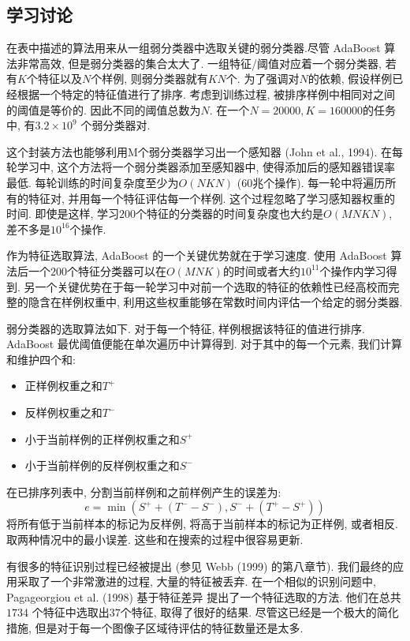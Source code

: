 \documentclass[a4paper,utf8,11pt, onecolumn]{ctexart}
\begin{document}
\subsection{学习讨论}
在表中描述的算法用来从一组弱分类器中选取关键的弱分类器.尽管 AdaBoost 算法非常高效, 但是弱分类器的集合太大了. 一组特征/阈值对应着一个弱分类器, 若有$K$个特征以及$N$个样例, 则弱分类器就有$KN$个. 为了强调对$N$的依赖, 假设样例已经根据一个特定的特征值进行了排序. 考虑到训练过程, 被排序样例中相同对之间的阈值是等价的. 因此不同的阈值总数为$N$. 在一个$N=20000, K=160000$的任务中, 有$3.2\times 10^9$ 个弱分类器对.

这个封装方法也能够利用M个弱分类器学习出一个感知器 (John et al., 1994). 在每轮学习中, 这个方法将一个弱分类器添加至感知器中, 使得添加后的感知器错误率最低. 每轮训练的时间复杂度至少为$O(NKN)$ ($60$兆个操作). 每一轮中将遍历所有的特征对, 并用每一个特征评估每一个样例.
这个过程忽略了学习感知器权重的时间. 即使是这样, 学习$200$个特征的分类器的时间复杂度也大约是$O(MNKN)$, 差不多是$10^{16}$个操作.

作为特征选取算法, AdaBoost 的一个关键优势就在于学习速度. 使用 AdaBoost 算法后一个$200$个特征分类器可以在$O(MNK)$的时间或者大约$10^{11}$个操作内学习得到. 另一个关键优势在于每一轮学习中对前一个选取的特征的依赖性已经高校而完整的隐含在样例权重中, 利用这些权重能够在常数时间内评估一个给定的弱分类器.

弱分类器的选取算法如下. 对于每一个特征, 样例根据该特征的值进行排序. AdaBoost 最优阈值便能在单次遍历中计算得到. 对于其中的每一个元素, 我们计算和维护四个和:
\begin{itemize}
\item 正样例权重之和$T^+$
\item 反样例权重之和$T^-$
\item 小于当前样例的正样例权重之和$S^+$
\item 小于当前样例的反样例权重之和$S^-$
\end{itemize}
在已排序列表中, 分割当前样例和之前样例产生的误差为:
\[
e=\min(S^++(T^--S^-),S^-+(T^+-S^+))
\]
将所有低于当前样本的标记为反样例, 将高于当前样本的标记为正样例, 或者相反. 取两种情况中的最小误差. 这些和在搜索的过程中很容易更新.

有很多的特征识别过程已经被提出 (参见 Webb (1999) 的第八章节). 我们最终的应用采取了一个非常激进的过程, 大量的特征被丢弃. 在一个相似的识别问题中,  Pagageorgiou et al. (1998) 基于特征差异
提出了一个特征选取的方法. 他们在总共 $1734$ 个特征中选取出$37$个特征, 取得了很好的结果. 尽管这已经是一个极大的简化措施, 但是对于每一个图像子区域待评估的特征数量还是太多.
\end{document}
